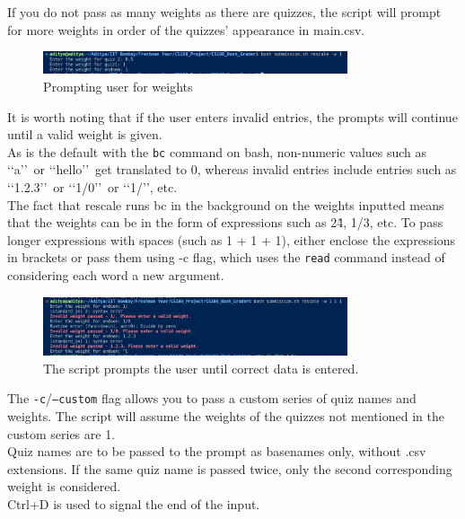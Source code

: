 \documentclass{article}
\begin{document}
    If you do not pass as many weights as there are quizzes, the script will prompt for more weights in order of the quizzes' appearance in main.csv.
    \begin{figure}[htbp]
        \centering
        \includegraphics[width=0.8\textwidth]{Prompt for weights}
        \caption{Prompting user for weights}
        \label{fig:prompt_weights}
    \end{figure}

    It is worth noting that if the user enters invalid entries, the prompts will continue until a valid weight is given.\\
    As is the default with the \texttt{bc} command on bash, non-numeric values such as \lq\lq a\rq\rq\ or \lq\lq hello\rq\rq\ get translated to 0, whereas invalid entries include entries such as \lq\lq 1.2.3\rq\rq\ or \lq\lq 1/0\rq\rq\ or \lq\lq 1/\rq\rq, etc.\\
    The fact that rescale runs bc in the background on the weights inputted means that the weights can be in the form of expressions such as 2\^4, 1/3, etc. To pass longer expressions with spaces (such as 1 + 1 + 1), either enclose the expressions in brackets or pass them using -c flag, which uses the \texttt{read} command instead of considering each word a new argument. \\
    \begin{figure}[htbp]
        \centering
        \includegraphics[width=0.8\textwidth]{Prompting_for_Correct_Weights}
        \caption{The script prompts the user until correct data is entered.}
        \label{fig:rescale_expr}
    \end{figure}

    The \texttt{-c}/\texttt{--custom} flag allows you to pass a custom series of quiz names and weights. The script will assume the weights of the quizzes not mentioned in the custom series are 1.\\
    Quiz names are to be passed to the prompt as basenames only, without .csv extensions. If the same quiz name is passed twice, only the second corresponding weight is considered.\\
    Ctrl+D is used to signal the end of the input.\\
\end{document}
